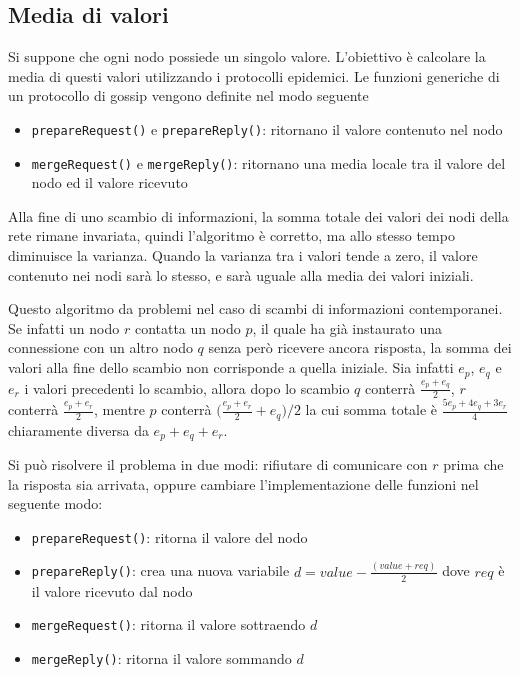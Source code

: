 \subsection{Media di valori}
Si suppone che ogni nodo possiede un singolo valore. L'obiettivo è calcolare la media di questi valori utilizzando i protocolli epidemici. Le funzioni generiche di un protocollo di gossip vengono definite nel modo seguente
\begin{itemize}
    \item \texttt{prepareRequest()} e \texttt{prepareReply()}: ritornano il valore contenuto nel nodo
    \item \texttt{mergeRequest()} e \texttt{mergeReply()}: ritornano una media locale tra il valore del nodo ed il valore ricevuto
\end{itemize}
Alla fine di uno scambio di informazioni, la somma totale dei valori dei nodi della rete rimane invariata, quindi l'algoritmo è corretto, ma allo stesso tempo diminuisce la varianza. Quando la varianza tra i valori tende a zero, il valore contenuto nei nodi sarà lo stesso, e sarà uguale alla media dei valori iniziali.

Questo algoritmo da problemi nel caso di scambi di informazioni contemporanei. Se infatti un nodo $r$ contatta un nodo $p$, il quale ha già instaurato una connessione con un altro nodo $q$ senza però ricevere ancora risposta, la somma dei valori alla fine dello scambio non corrisponde a quella iniziale. Sia infatti $e_p$, $e_q$ e $e_r$ i valori precedenti lo scambio, allora dopo lo scambio $q$ conterrà $\frac{e_p+e_q}{2}$, $r$ conterrà $\frac{e_p + e_r}{2}$, mentre $p$ conterrà $\Big(\frac{e_p+e_r}{2} + e_q\Big) / 2$ la cui somma totale è $\frac{5e_p + 4 e_q + 3e_r}{4}$ chiaramente diversa da $e_p+e_q+e_r$.

Si può risolvere il problema in due modi: rifiutare di comunicare con $r$ prima che la risposta sia arrivata, oppure cambiare l'implementazione delle funzioni nel seguente modo:
\begin{itemize}
    \item \texttt{prepareRequest()}: ritorna il valore del nodo
    \item \texttt{prepareReply()}: crea una nuova variabile $d=value - \frac{(value + req)}{2}$ dove $req$ è il valore ricevuto dal nodo
    \item \texttt{mergeRequest()}: ritorna il valore sottraendo $d$
    \item \texttt{mergeReply()}: ritorna il valore sommando $d$
\end{itemize}


